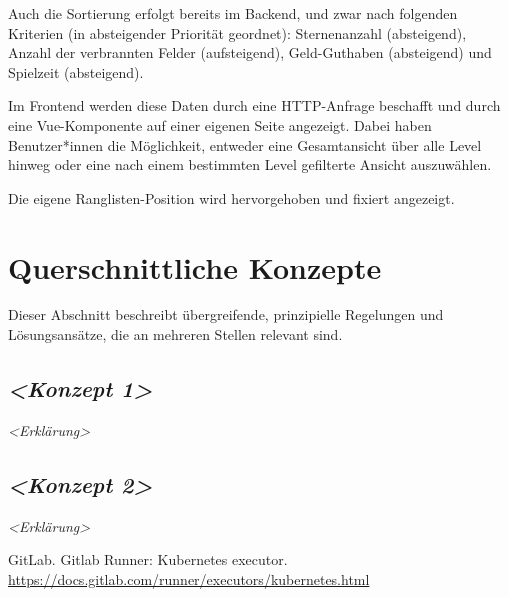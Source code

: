 \documentclass[letterpaper, 10 pt, conference]{ieeeconf}
\begin{document}
Auch die Sortierung erfolgt bereits im Backend, und zwar nach folgenden Kriterien (in absteigender Priorität geordnet):
Sternenanzahl (absteigend), Anzahl der verbrannten Felder (aufsteigend), Geld-Guthaben (absteigend) und Spielzeit (absteigend).

Im Frontend werden diese Daten durch eine HTTP-Anfrage beschafft und durch eine Vue-Komponente auf einer eigenen Seite angezeigt.
Dabei haben Benutzer*innen die Möglichkeit, entweder eine Gesamtansicht über alle Level hinweg oder eine nach einem bestimmten Level gefilterte Ansicht auszuwählen.

Die eigene Ranglisten-Position wird hervorgehoben und fixiert angezeigt.

\section{Querschnittliche Konzepte}

Dieser Abschnitt beschreibt übergreifende, prinzipielle Regelungen und
Lösungsansätze, die an mehreren Stellen relevant sind.

\subsection{\texorpdfstring{\emph{\textless Konzept
1\textgreater{}}}{\textless Konzept 1\textgreater{}}}

\emph{\textless Erklärung\textgreater{}}

\subsection{\texorpdfstring{\emph{\textless Konzept
2\textgreater{}}}{\textless Konzept 2\textgreater{}}}

\emph{\textless Erklärung\textgreater{}}

\begin{thebibliography}{99}

 GitLab.  Gitlab Runner: Kubernetes executor.   \url{https://docs.gitlab.com/runner/executors/kubernetes.html}

\end{thebibliography}


\addtolength{\textheight}{-12cm}
\end{document}
